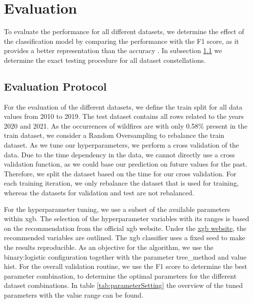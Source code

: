 \documentclass[
]{ceurart}
\begin{document}
\section{Evaluation}
To evaluate the performance for all different datasets, we determine the effect of the classification model by comparing the performance with the F1 score, as it provides a better representation than the accuracy \cite{Maimon.2010}. In subsection \ref{cha:EvaluationProtocol} we determine the exact testing procedure for all dataset constellations.

\subsection{Evaluation Protocol}\label{cha:EvaluationProtocol}
For the evaluation of the different datasets, we define the train split for all data values from 2010 to 2019. The test dataset contains all rows related to the years 2020 and 2021. As the occurrences of wildfires are with only 0.58\% present in the train dataset, we consider a Random Oversampling to rebalance the train dataset. As we tune our hyperparameters, we perform a cross validation of the data. Due to the time dependency in the data, we cannot directly use a cross validation function, as we could base our prediction on future values for the past. Therefore, we split the dataset based on the time for our cross validation. For each training iteration, we only rebalance the dataset that is used for training, whereas the datasets for validation and test are not rebalanced.

For the hyperparameter tuning, we use a subset of the available parameters within \gls*{xgb}. The selection of the hyperparameter variables with its ranges is based on the recommendation from the official \gls*{xgb} website. Under the \href{https://xgboost.readthedocs.io/en/stable/tutorials/param_tuning.html}{\gls*{xgb} website}, the recommended variables are outlined. The \gls*{xgb} classifier uses a fixed seed to make the results reproducible. As an objective for the algorithm, we use the binary:logistic configuration together with the parameter tree\_method and value hist. For the overall validation routine, we use the F1 score to determine the best parameter combination, to determine the optimal parameters for the different dataset combinations. In table \ref{tab:parameterSetting} the overview of the tuned parameters with the value range can be found.
\end{document}
